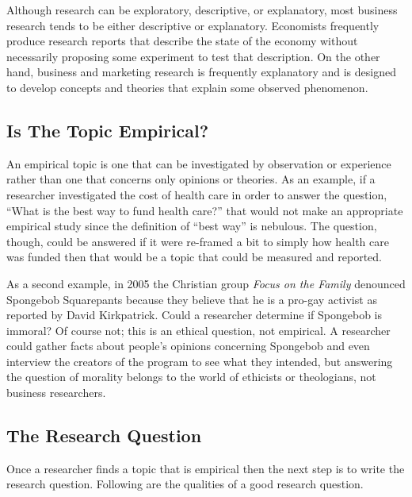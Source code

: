 Although research can be exploratory, descriptive, or explanatory, most business research tends to be either descriptive or explanatory. Economists frequently produce research reports that describe the state of the economy without necessarily proposing some experiment to test that description. On the other hand, business and marketing research is frequently explanatory and is designed to develop concepts and theories that explain some observed phenomenon.

\subsection{Is The Topic Empirical?}

An empirical topic is one that can be investigated by observation or experience rather than one that concerns only opinions or theories. As an example, if a researcher investigated the cost of health care in order to answer the question, ``What is the best way to fund health care?'' that would not make an appropriate empirical study since the definition of ``best way'' is nebulous. The question, though, could be answered if it were re-framed a bit to simply how health care was funded then that would be a topic that could be measured and reported.

As a second example, in 2005 the Christian group \textit{Focus on the Family} denounced Spongebob Squarepants because they believe that he is a pro-gay activist as reported by David Kirkpatrick\cite{kirkpatrick2005conservatives}. Could a researcher determine if Spongebob is immoral? Of course not; this is an ethical question, not empirical. A researcher could gather facts about people's opinions concerning Spongebob and even interview the creators of the program to see what they intended, but answering the question of morality belongs to the world of ethicists or theologians, not business researchers.

\subsection{The Research Question}

Once a researcher finds a topic that is empirical then the next step is to write the research question. Following are the qualities of a good research question.

